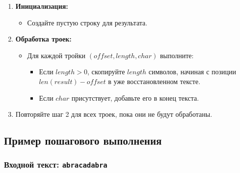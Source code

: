 \begin{enumerate}
  \item \textbf{Инициализация:}
    \begin{itemize}
      \item Создайте пустую строку для результата.
    \end{itemize}

  \item \textbf{Обработка троек:}
    \begin{itemize}
      \item Для каждой тройки $(offset, length, char)$ выполните:
        \begin{itemize}
          \item Если $length > 0$, скопируйте $length$ символов, начиная с позиции $len(result) - offset$ в уже восстановленном тексте.
          \item Если $char$ присутствует, добавьте его в конец текста.
        \end{itemize}
    \end{itemize}

  \item Повторяйте шаг 2 для всех троек, пока они не будут обработаны.
\end{enumerate}

\subsection*{Пример пошагового выполнения}

\subsubsection*{Входной текст: \texttt{abracadabra}}


